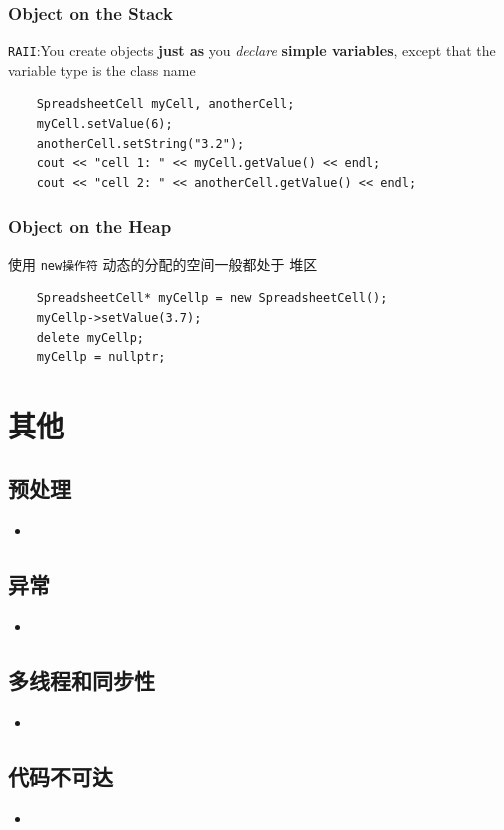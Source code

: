 \documentclass[UTF8,a4paper,12pt]{ctexbook} %
\begin{document}
		\subsubsection{Object on the Stack}
			\verb|RAII|:You create objects \textbf{just as }you \textit{declare} \textbf{simple variables}, except that the variable type is the class
			name
			\begin{lstlisting}
	SpreadsheetCell myCell, anotherCell;
	myCell.setValue(6);
	anotherCell.setString("3.2");
	cout << "cell 1: " << myCell.getValue() << endl;
	cout << "cell 2: " << anotherCell.getValue() << endl;
			\end{lstlisting}
			
		\subsubsection{Object on the Heap}
			使用 \verb|new操作符| 动态的分配的空间一般都处于 堆区
		\begin{lstlisting}
	SpreadsheetCell* myCellp = new SpreadsheetCell();
	myCellp->setValue(3.7);
	delete myCellp;
	myCellp = nullptr;
		\end{lstlisting}
		
\section{其他}
		\subsection{预处理}
			\begin{itemize}
				\item 
			\end{itemize}
		\subsection{异常}
			\begin{itemize}
				\item 
			\end{itemize}
		\subsection{多线程和同步性}
			\begin{itemize}
				\item 
			\end{itemize}
		\subsection{代码不可达}
			\begin{itemize}
				\item 
			\end{itemize}
\end{document}
